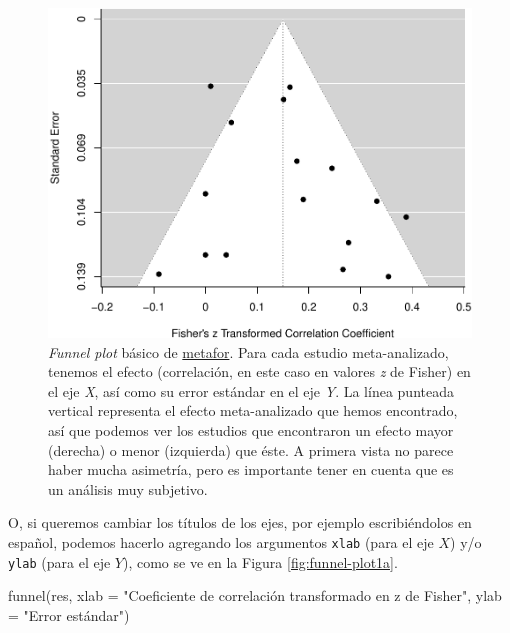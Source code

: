\documentclass[
  bookmarksnumbered]{article}
\newenvironment{Shaded}{\begin{snugshade}}{\end{snugshade}}
\newcommand{\AttributeTok}[1]{\textcolor[rgb]{0.00,0.34,0.68}{#1}}
\newcommand{\FunctionTok}[1]{\textcolor[rgb]{0.39,0.29,0.61}{#1}}
\newcommand{\NormalTok}[1]{\textcolor[rgb]{0.12,0.11,0.11}{#1}}
\newcommand{\StringTok}[1]{\textcolor[rgb]{0.75,0.01,0.01}{#1}}
\begin{document}
\begin{figure}
\centering
\includegraphics{Meta-analysis_files/figure-latex/funnel-plot1-1.pdf}
\caption{\label{fig:funnel-plot1}\emph{Funnel plot} básico de \href{https://www.metafor-project.org/doku.php}{metafor}. Para cada estudio meta-analizado, tenemos el efecto (correlación, en este caso en valores \emph{z} de Fisher) en el eje \emph{X}, así como su error estándar en el eje \emph{Y}. La línea punteada vertical representa el efecto meta-analizado que hemos encontrado, así que podemos ver los estudios que encontraron un efecto mayor (derecha) o menor (izquierda) que éste. A primera vista no parece haber mucha asimetría, pero es importante tener en cuenta que es un análisis muy subjetivo.}
\end{figure}

O, si queremos cambiar los títulos de los ejes, por ejemplo escribiéndolos en español, podemos hacerlo agregando los argumentos \texttt{xlab} (para el eje \(X\)) y/o \texttt{ylab} (para el eje \(Y\)), como se ve en la Figura \ref{fig:funnel-plot1a}.

\begin{Shaded}
\begin{Highlighting}[]
\FunctionTok{funnel}\NormalTok{(res, }
       \AttributeTok{xlab =} \StringTok{"Coeficiente de correlación transformado en z de Fisher"}\NormalTok{,}
       \AttributeTok{ylab =} \StringTok{"Error estándar"}\NormalTok{)}
\end{Highlighting}
\end{Shaded}
\end{document}
